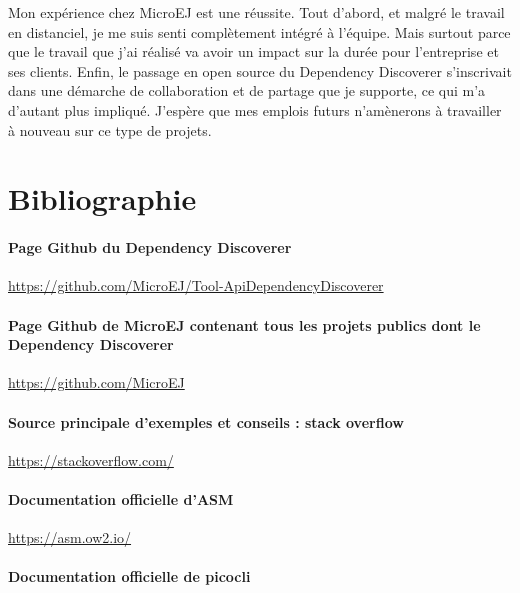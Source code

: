 \documentclass[french,a4paper,12pt]{report}
\begin{document}
Mon expérience chez MicroEJ est une réussite. Tout d'abord, et malgré le travail en distanciel, je me suis senti complètement intégré à l'équipe. Mais surtout parce que le travail que j'ai réalisé va avoir un impact sur la durée pour l'entreprise et ses clients. Enfin, le passage en open source du Dependency Discoverer s'inscrivait dans une démarche de collaboration et de partage que je supporte, ce qui m'a d'autant plus impliqué. J'espère que mes emplois futurs n’amènerons à travailler à nouveau sur ce type de projets.


\chapter*{Bibliographie}

\subsubsection{Page Github du Dependency Discoverer}

\href{https://github.com/MicroEJ/Tool-ApiDependencyDiscoverer}{https://github.com/MicroEJ/Tool-ApiDependencyDiscoverer}

\subsubsection{Page Github de MicroEJ contenant tous les projets publics dont le Dependency Discoverer}

\href{https://github.com/MicroEJ}{https://github.com/MicroEJ}

\subsubsection{Source principale d'exemples et conseils : stack overflow}

\href{https://stackoverflow.com/}{https://stackoverflow.com/}

\subsubsection{Documentation officielle d'ASM}

\href{https://asm.ow2.io/}{https://asm.ow2.io/}

\subsubsection{Documentation officielle de picocli}
\end{document}
